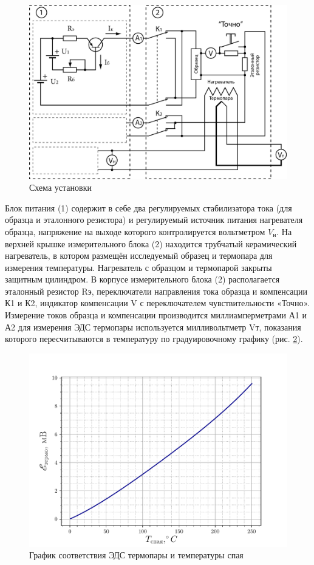 \begin{figure}[h!]
	\centering
	\includegraphics[width = .9\linewidth]{img/scheme-2.jpg}
	\caption{Схема установки}
	\label{fig:6.2}
\end{figure}

Блок питания (1) содержит в себе два регулируемых стабилизатора тока (для образца и эталонного резистора) и регулируемый
источник питания нагревателя образца, напряжение на выходе которого контролируется вольтметром $V_\text{н}$. На верхней
крышке измерительного блока (2) находится трубчатый керамический нагреватель, в котором размещён исследуемый образец и
термопара для измерения температуры. Нагреватель с образцом и термопарой закрыты защитным цилиндром. В корпусе
измерительного блока (2) располагается эталонный резистор Rэ, переключатели направления тока образца и компенсации К1 и
К2, индикатор компенсации V с переключателем чувствительности «Точно». Измерение токов образца и компенсации
производится миллиамперметрами А1 и А2 для измерения ЭДС термопары используется милливольтметр Vт, показания которого
пересчитываются в температуру по градуировочному графику (рис. \ref{fig:6.3}).

\begin{figure}[h!]
	\centering
	\includegraphics[width = .9\linewidth]{img/grad.pdf}
	\caption{График соответствия ЭДС термопары и температуры спая}
	\label{fig:6.3}
\end{figure}


